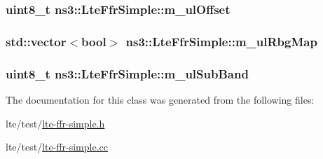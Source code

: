 \subsubsection[{\texorpdfstring{m\+\_\+ul\+Offset}{m_ulOffset}}]{\setlength{\rightskip}{0pt plus 5cm}uint8\+\_\+t ns3\+::\+Lte\+Ffr\+Simple\+::m\+\_\+ul\+Offset\hspace{0.3cm}{\ttfamily [private]}}\hypertarget{classns3_1_1LteFfrSimple_aecad2931c0699de2c4df244e937dbea5}{}\label{classns3_1_1LteFfrSimple_aecad2931c0699de2c4df244e937dbea5}
\subsubsection[{\texorpdfstring{m\+\_\+ul\+Rbg\+Map}{m_ulRbgMap}}]{\setlength{\rightskip}{0pt plus 5cm}std\+::vector$<$bool$>$ ns3\+::\+Lte\+Ffr\+Simple\+::m\+\_\+ul\+Rbg\+Map\hspace{0.3cm}{\ttfamily [private]}}\hypertarget{classns3_1_1LteFfrSimple_a959fbd224766db19d6e515a489edf85e}{}\label{classns3_1_1LteFfrSimple_a959fbd224766db19d6e515a489edf85e}
\subsubsection[{\texorpdfstring{m\+\_\+ul\+Sub\+Band}{m_ulSubBand}}]{\setlength{\rightskip}{0pt plus 5cm}uint8\+\_\+t ns3\+::\+Lte\+Ffr\+Simple\+::m\+\_\+ul\+Sub\+Band\hspace{0.3cm}{\ttfamily [private]}}\hypertarget{classns3_1_1LteFfrSimple_aaa17d1f4400375af086fcf3df4250bc6}{}\label{classns3_1_1LteFfrSimple_aaa17d1f4400375af086fcf3df4250bc6}


The documentation for this class was generated from the following files\+:\begin{DoxyCompactItemize}
\item 
lte/test/\hyperlink{lte-ffr-simple_8h}{lte-\/ffr-\/simple.\+h}\item 
lte/test/\hyperlink{lte-ffr-simple_8cc}{lte-\/ffr-\/simple.\+cc}\end{DoxyCompactItemize}
